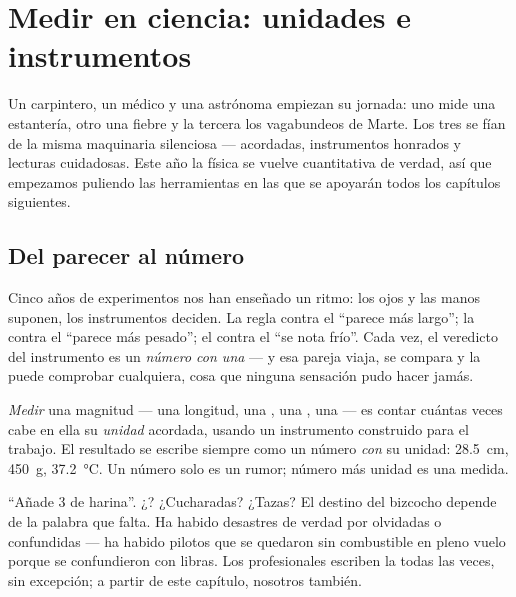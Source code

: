 \chapter{Medir en ciencia: unidades e instrumentos}\label{ch:g6:measurement-in-science}

Un carpintero, un médico y una astrónoma empiezan su jornada: uno
mide una estantería, otro una fiebre y la tercera los vagabundeos
de Marte. Los tres se fían de la misma maquinaria silenciosa ---
 acordadas, instrumentos honrados y lecturas cuidadosas.
Este año la física se vuelve cuantitativa de verdad, así que empezamos
puliendo las herramientas en las que se apoyarán todos los capítulos
siguientes.

\section{Del parecer al número}

Cinco años de experimentos nos han enseñado un ritmo: los ojos y las
manos suponen, los instrumentos deciden. La regla contra el ``parece
más largo''; la  contra el ``parece más pesado''; el
 contra el ``se nota frío''. Cada vez, el veredicto del
instrumento es un \emph{número con una } --- y esa pareja
viaja, se compara y la puede comprobar cualquiera, cosa que ninguna
sensación pudo hacer jamás.

\begin{definition}\label{def:g6:measurement-in-science:measuring}
\emph{Medir} una magnitud --- una longitud, una
, una , una  --- es contar cuántas
veces cabe en ella su \emph{unidad} acordada, usando un
instrumento construido para el trabajo. El resultado se escribe
siempre como un número \emph{con} su unidad: \qty{28.5}{cm},
\qty{450}{g}, \qty{37.2}{\celsius}. Un número solo es un rumor;
número más unidad es una medida.
\end{definition}

\begin{example}\label{ex:g6:measurement-in-science:missing}
``Añade 3 de harina''. ¿? ¿Cucharadas? ¿Tazas? El destino del
bizcocho depende de la palabra que falta. Ha habido desastres de
verdad por  olvidadas o confundidas --- ha habido pilotos que
se quedaron sin combustible en pleno vuelo porque se confundieron
 con libras. Los profesionales escriben la 
todas las veces, sin excepción; a partir de este capítulo, nosotros
también.
\end{example}

